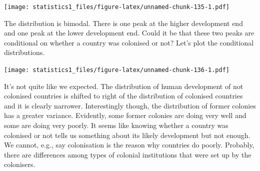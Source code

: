 \documentclass[]{book}
\newenvironment{Shaded}{\begin{snugshade}}{\end{snugshade}}
\newcommand{\KeywordTok}[1]{\textcolor[rgb]{0.13,0.29,0.53}{\textbf{#1}}}
\newcommand{\DataTypeTok}[1]{\textcolor[rgb]{0.13,0.29,0.53}{#1}}
\newcommand{\DecValTok}[1]{\textcolor[rgb]{0.00,0.00,0.81}{#1}}
\newcommand{\StringTok}[1]{\textcolor[rgb]{0.31,0.60,0.02}{#1}}
\newcommand{\OperatorTok}[1]{\textcolor[rgb]{0.81,0.36,0.00}{\textbf{#1}}}
\newcommand{\NormalTok}[1]{#1}
\theoremstyle{definition}
\theoremstyle{definition}
\theoremstyle{definition}
\theoremstyle{remark}
\begin{document}
\begin{Shaded}
\end{Shaded}

\texttt{[image: statistics1\_files/figure-latex/unnamed-chunk-135-1.pdf]}

The distribution is bimodal. There is one peak at the higher development
end and one peak at the lower development end. Could it be that these
two peaks are conditional on whether a country was colonised or not?
Let's plot the conditional distributions.

\begin{Shaded}
\end{Shaded}

\texttt{[image: statistics1\_files/figure-latex/unnamed-chunk-136-1.pdf]}

It's not quite like we expected. The distribution of human development
of not colonised countries is shifted to right of the distribution of
colonised countries and it is clearly narrower. Interestingly though,
the distribution of former colonies has a greater variance. Evidently,
some former colonies are doing very well and some are doing very poorly.
It seems like knowing whether a country was colonised or not tells us
something about its likely development but not enough. We cannot, e.g.,
say colonisation is the reason why countries do poorly. Probably, there
are differences among types of colonial institutions that were set up by
the colonisers.
\end{document}
